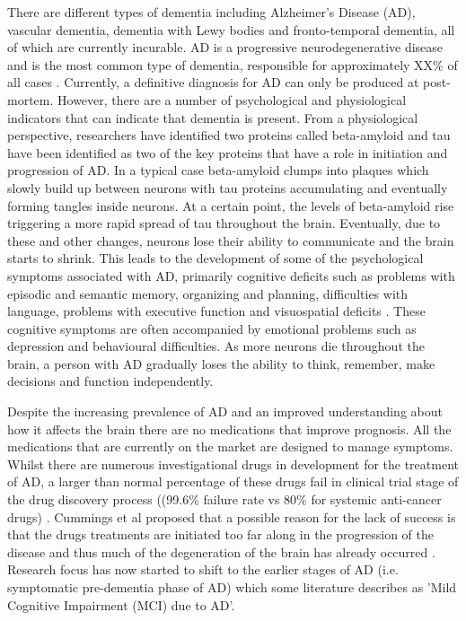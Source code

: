 \documentclass[12pt]{article}
\begin{document}
There are different types of dementia including Alzheimer's Disease (AD), vascular dementia, dementia with Lewy bodies and fronto-temporal dementia, all of which are currently incurable. AD is a progressive neurodegenerative disease and is the most common type of dementia, responsible for approximately XX\% of all cases \cite{}. Currently, a definitive diagnosis for AD can only be produced at post-mortem. However, there are a number of psychological and physiological indicators that can indicate that dementia is present. From a physiological perspective, researchers have identified two proteins called beta-amyloid and tau have been identified as two of the key proteins that have a role in initiation and progression of AD. In a typical case beta-amyloid clumps into plaques which slowly build up between neurons with tau proteins accumulating and eventually forming tangles inside neurons. At a certain point, the levels of beta-amyloid rise triggering a more rapid spread of tau throughout the brain. Eventually, due to these and other changes, neurons lose their ability to communicate and the brain starts to shrink. This leads to the development of some of the psychological symptoms associated with AD, primarily cognitive deficits such as problems with episodic and semantic memory, organizing and planning, difficulties with language, problems with executive function and visuospatial deficits \cite{McKhann2011}. These cognitive symptoms are often accompanied by emotional problems such as depression and behavioural difficulties. As more neurons die throughout the brain, a person with AD gradually loses the ability to think, remember, make decisions and function independently.
\par
Despite the increasing prevalence of AD and an improved understanding about how it affects the brain there are no medications that improve prognosis. All the medications that are currently on the market are designed to manage symptoms. Whilst there are numerous investigational drugs in development for the treatment of AD, a larger than normal percentage of these drugs fail in clinical trial stage of the drug discovery process ((99.6\% failure rate vs 80\% for systemic anti-cancer drugs) \cite{Cummings2014}. Cummings et al proposed that a possible reason for the lack of success is that the drugs treatments are initiated too far along in the progression of the disease and thus much of the degeneration of the brain has already occurred \cite{Cummings2014}. Research focus has now started to shift to the earlier stages of AD (i.e. symptomatic pre-dementia phase of AD) which some literature describes as 'Mild Cognitive Impairment (MCI) due to AD'.
\end{document}
